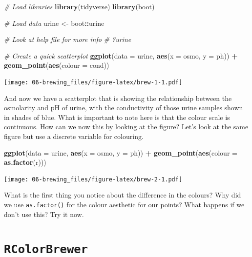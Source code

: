 \documentclass[]{book}
\newenvironment{Shaded}{\begin{snugshade}}{\end{snugshade}}
\newcommand{\KeywordTok}[1]{\textcolor[rgb]{0.13,0.29,0.53}{\textbf{#1}}}
\newcommand{\DataTypeTok}[1]{\textcolor[rgb]{0.13,0.29,0.53}{#1}}
\newcommand{\StringTok}[1]{\textcolor[rgb]{0.31,0.60,0.02}{#1}}
\newcommand{\CommentTok}[1]{\textcolor[rgb]{0.56,0.35,0.01}{\textit{#1}}}
\newcommand{\OperatorTok}[1]{\textcolor[rgb]{0.81,0.36,0.00}{\textbf{#1}}}
\newcommand{\NormalTok}[1]{#1}
\theoremstyle{definition}
\theoremstyle{definition}
\theoremstyle{definition}
\theoremstyle{remark}
\begin{document}
\begin{Shaded}
\begin{Highlighting}[]
\CommentTok{# Load libraries}
\KeywordTok{library}\NormalTok{(tidyverse)}
\KeywordTok{library}\NormalTok{(boot)}

\CommentTok{# Load data}
\NormalTok{urine <-}\StringTok{ }\NormalTok{boot}\OperatorTok{::}\NormalTok{urine}

\CommentTok{# Look at help file for more info}
\CommentTok{# ?urine}

\CommentTok{# Create a quick scatterplot}
\KeywordTok{ggplot}\NormalTok{(}\DataTypeTok{data =}\NormalTok{ urine, }\KeywordTok{aes}\NormalTok{(}\DataTypeTok{x =}\NormalTok{ osmo, }\DataTypeTok{y =}\NormalTok{ ph)) }\OperatorTok{+}
\StringTok{  }\KeywordTok{geom_point}\NormalTok{(}\KeywordTok{aes}\NormalTok{(}\DataTypeTok{colour =}\NormalTok{ cond))}
\end{Highlighting}
\end{Shaded}

\texttt{[image: 06-brewing\_files/figure-latex/brew-1-1.pdf]}

And now we have a scatterplot that is showing the relationship between
the osmolarity and pH of urine, with the conductivity of those urine
samples shown in shades of blue. What is important to note here is that
the colour scale is continuous. How can we now this by looking at the
figure? Let's look at the same figure but use a discrete variable for
colouring.

\begin{Shaded}
\begin{Highlighting}[]
\KeywordTok{ggplot}\NormalTok{(}\DataTypeTok{data =}\NormalTok{ urine, }\KeywordTok{aes}\NormalTok{(}\DataTypeTok{x =}\NormalTok{ osmo, }\DataTypeTok{y =}\NormalTok{ ph)) }\OperatorTok{+}
\StringTok{  }\KeywordTok{geom_point}\NormalTok{(}\KeywordTok{aes}\NormalTok{(}\DataTypeTok{colour =} \KeywordTok{as.factor}\NormalTok{(r)))}
\end{Highlighting}
\end{Shaded}

\texttt{[image: 06-brewing\_files/figure-latex/brew-2-1.pdf]}

What is the first thing you notice about the difference in the colours?
Why did we use \texttt{as.factor()} for the colour aesthetic for our
points? What happens if we don't use this? Try it now.

\section{\texorpdfstring{\textbf{\texttt{RColorBrewer}}}{RColorBrewer}}\label{rcolorbrewer}
\end{document}
